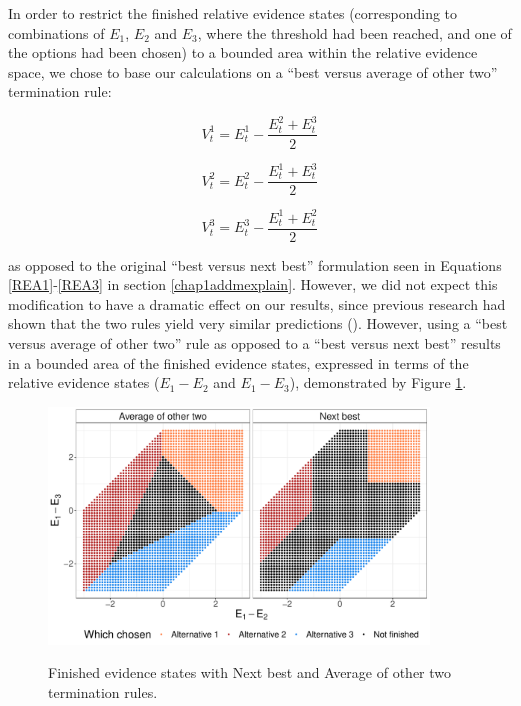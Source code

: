 \documentclass[11pt,a4paper]{article}
\begin{document}
In order to restrict the finished relative evidence states (corresponding to combinations of $E_{1}$, $E_{2}$ and $E_{3}$, where the threshold had been reached, and one of the options had been chosen) to a bounded area within the relative evidence space, we chose to base our calculations on a ``best versus average of other two''  termination rule:

\begin{equation} \label{REA1pd}
V_{t}^{1}=E_{t}^{1}-\frac{E_{t}^{2}+E_{t}^{3}}{2}
\end{equation}

\begin{equation} \label{REA2pd}
V_{t}^{2}=E_{t}^{2}-\frac{E_{t}^{1}+E_{t}^{3}}{2}
\end{equation}


\begin{equation} \label{REA3pd}
V_{t}^{3}=E_{t}^{3}-\frac{E_{t}^{1}+E_{t}^{2}}{2}
\end{equation}

as opposed to the original ``best versus next best'' formulation seen in Equations \ref{REA1}-\ref{REA3} in section \ref{chap1addmexplain}. However, we did not expect this modification to have a dramatic effect on our results, since previous research had shown that the two rules yield very similar predictions (). However, using a ``best versus average of other two'' rule as opposed to a ``best versus next best'' results in a bounded area of the finished evidence states, expressed in terms of the relative evidence states ($E_{1}-E_{2}$ and $E_{1}-E_{3}$), demonstrated by Figure \ref{fig:rulesfinished}.

\begin{figure}[htp!]
\captionsetup{justification=centering}
\centering
\caption{Finished evidence states with Next best and Average of other two termination rules.}
\includegraphics[width=0.9\textwidth]{rulesfinished.pdf}
\label{fig:rulesfinished}
\end{figure}
\end{document}
